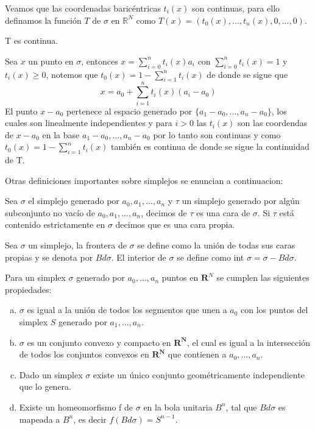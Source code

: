 Veamos que las coordenadas baricéntricas $t_i(x)$ son continuas, para ello definamos la función $T$ de $\sigma$ en $\mathbb{R}^{N}$ como $T(x) = (t_0(x),...,t_n(x),0,...,0)$.
\begin{Prop}
T es continua.
\end{Prop}
\begin{Dem}

Sea $x$ un punto en $\sigma$, entonces $x=\sum_{i=0}^{n}t_i(x)a_i$ con $\sum_{i=0}^{n}t_i(x)=1$ y 
$t_i(x)\geq 0$, notemos que $t_0(x) = 1-\sum_{i=1}^{n}t_i(x)$ de donde se sigue que 
\begin{equation}
x = a_0 + \sum_{i=1}^{n}t_i(x)(a_i-a_0)
\end{equation}
El punto $x-a_0$ pertenece al espacio generado por $\{a_1-a_0,...,a_n-a_0\}$, los cuales son linealmente independientes y para $i>0$ las $t_i(x)$  son las coordendas de $x-a_0$ en la base $a_1-a_0,...,a_n-a_0$ por lo tanto son continuas y  como $t_0(x) = 1-\sum_{i=1}^{n}t_i(x)$ también es continua de donde se sigue la continuidad de T. 
\end{Dem}
Otras definiciones importantes sobre simplejos se enuncian a continuacion:
\begin{Defi}
Sea $\sigma$ el simplejo generado por $a_0,a_1,...,a_n$ y $\tau$ un simplejo generado por algún subconjunto no vacío de $a_0,a_1,...,a_n$, decimos de $\tau$ es una cara de $\sigma$. Si $\tau$ está contenido estrictamente en $\sigma$ decimos que es una cara propia. 
\end{Defi}
\begin{Defi}
Sea $\sigma$ un simplejo, la frontera de $\sigma$ se define como la unión de todas sus caras propias y se denota por $Bd\sigma$. El interior de $\sigma$ se define como int $\sigma = \sigma-Bd\sigma$. 
\end{Defi}
\begin{Prop}
Para un simplex $\sigma$ generado por $a_0,...,a_n$ puntos en $\mathbf{R}^{N}$ se cumplen las siguientes propiedades:
\begin{enumerate}[(a)]
\item $\sigma$ es igual a la unión de todos los segmentos que unen a $a_0$ con los puntos del simplex $S$ generado por $a_1,...,a_n$.
\item $\sigma$ es un conjunto convexo y compacto en $\mathbf{R^{N}}$, el cual es igual a la intersección de todos los conjuntos convexos en $\mathbf{R^{N}}$ que contienen a $a_0,...,a_n$.
\item Dado un simplex $\sigma$ existe un único conjunto geométricamente independiente que lo genera.
\item Existe un homeomorfismo f de $\sigma$ en la bola unitaria $B^n$, tal que $Bd\sigma$ es mapeada a $B^n$, es decir $f(Bd\sigma) = S^{n-1}$.
\end{enumerate}
\end{Prop}

